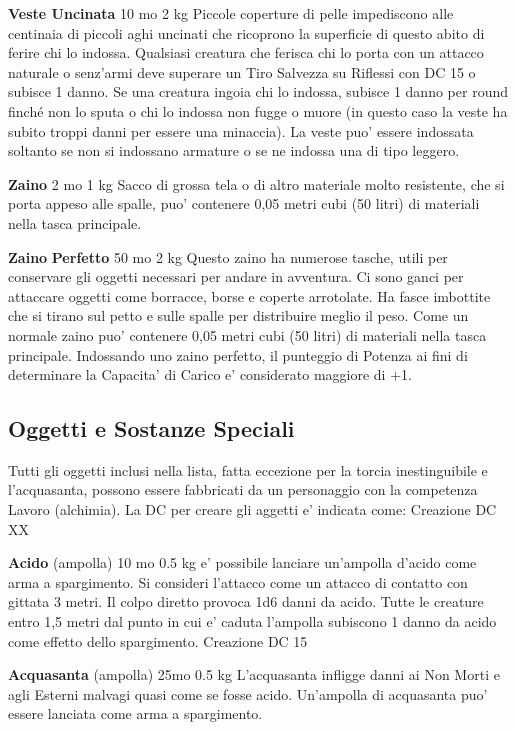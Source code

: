 \documentclass[a4paper,11pt,twoside,openany]{dndbook}
\begin{document}
{\textbf{Veste Uncinata} 10 mo 2 kg Piccole coperture di pelle impediscono alle centinaia di piccoli aghi uncinati che ricoprono la superficie di questo abito di ferire chi lo indossa. Qualsiasi creatura che ferisca chi lo porta con un attacco naturale o senz'armi deve superare un Tiro Salvezza su Riflessi con DC 15 o subisce 1 danno. Se una creatura ingoia chi lo indossa, subisce 1 danno per round finché non lo sputa o chi lo indossa non fugge o muore (in questo caso la veste ha subito troppi danni per essere una minaccia). La veste puo' essere indossata soltanto se non si indossano armature o se ne indossa una di tipo leggero.

\textbf{Zaino} 2 mo 1 kg Sacco di grossa tela o di altro materiale molto resistente, che si porta appeso alle spalle, puo' contenere 0,05 metri cubi (50 litri) di materiali nella tasca principale. 

\textbf{Zaino} \textbf{Perfetto} 50 mo 2 kg Questo zaino ha numerose tasche, utili per conservare gli oggetti necessari per andare in avventura. Ci sono ganci per attaccare oggetti come borracce, borse e coperte arrotolate. Ha fasce imbottite che si tirano sul petto e sulle spalle per distribuire meglio il peso. Come un normale zaino puo' contenere 0,05 metri cubi (50 litri) di materiali nella tasca principale. Indossando uno zaino perfetto, il punteggio di Potenza ai fini di determinare la Capacita' di Carico e' considerato maggiore di +1.

\subsection{Oggetti e Sostanze Speciali}

\label{oggetti-e-sostanze-speciali}

Tutti gli oggetti inclusi nella lista, fatta eccezione per la torcia inestinguibile e l'acquasanta, possono essere fabbricati da un personaggio con la competenza Lavoro (alchimia). La DC per creare gli aggetti e' indicata come: Creazione DC XX

\textbf{Acido} (ampolla) 10 mo 0.5 kg e' possibile lanciare un'ampolla d'acido come arma a spargimento. Si consideri l'attacco come un attacco di contatto con gittata 3 metri. Il colpo diretto provoca 1d6 danni da acido. Tutte le creature entro 1,5 metri dal punto in cui e' caduta l'ampolla subiscono 1 danno da acido come effetto dello spargimento.
Creazione DC 15

\textbf{Acquasanta} (ampolla) 25mo 0.5 kg L'acquasanta infligge danni ai Non Morti e agli Esterni malvagi quasi come se fosse acido. Un'ampolla di acquasanta puo' essere lanciata come arma a spargimento.

}
\end{document}
